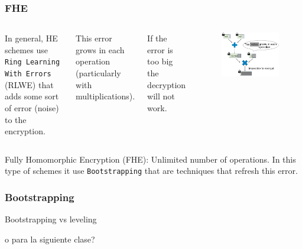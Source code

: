 \documentclass[10pt,handout]{beamer}
\begin{document}


\begin{frame}
    \frametitle{FHE}
  \begin{columns}
      In general, HE schemes use \texttt{Ring Learning With Errors} (RLWE) that  adds some sort of error (noise) to the encryption.

\vspace{0.3cm}
    This error grows in each operation (particularly with multiplications).

\vspace{0.3cm}
    If the error is too big the decryption will not work.
        \begin{figure}[h!]
            \centering
            \includegraphics[scale=0.2]{multNoise.jpg}
        \end{figure}

\end{columns}    Fully Homomorphic Encryption (FHE): Unlimited number of operations. In this type of schemes
    it use \texttt{Bootstrapping} that are techniques that refresh this error.


\end{frame}


\begin{frame}
\frametitle{Bootstrapping}

Bootstrapping vs leveling

o para la siguiente clase?
\end{frame}
\end{document}
